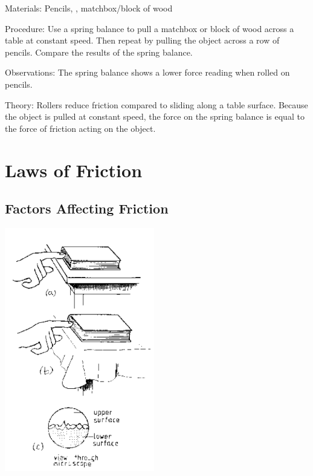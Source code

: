 \begin{multicols}{2}
\begin{description*}
\item[Materials:]{Pencils, , matchbox/block of wood}
\item[Procedure:]{Use a spring balance to pull a matchbox or block of wood across a table at constant speed. Then repeat by pulling the object across a row of pencils. Compare the results of the spring balance.}
\item[Observations:]{The spring balance shows a lower force reading when rolled on pencils.}
\item[Theory:]{Rollers reduce friction compared to sliding along a table surface. Because the object is pulled at constant speed, the force on the spring balance is equal to the force of friction acting on the object.}
\end{description*}


\section*{Laws of Friction}


\subsection{Factors Affecting Friction}

\begin{center}
\includegraphics[width=0.49\textwidth]{./img/source/friction-factors.png}
\end{center}


\end{multicols}
